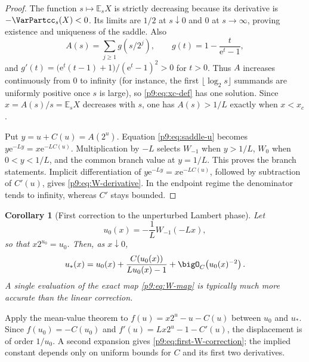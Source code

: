 \documentclass[11pt]{article}
\numberwithin{equation}{section}
\newtheorem{corollary}[theorem]{Corollary}
\theoremstyle{definition}
\theoremstyle{remark}
\newcommand{\E}{\mathbb E}
\newcommand{\e}{\mathrm e}
\begin{document}
\begin{proof}
The function $s\mapsto\E_sX$ is strictly decreasing because its derivative is
$-\VarPartcc_s(X)<0$.  Its limits are $1/2$ at $s\downarrow0$ and $0$ at $s\to\infty$, proving
existence and uniqueness of the saddle.  Also
\[
 A(s)=\sum_{j\ge1}g(s/2^j),\qquad
 g(t)=1-\frac{t}{\e^t-1},
\]
and
$g'(t)=\bigl(\e^t(t-1)+1\bigr)/(\e^t-1)^2>0$ for $t>0$.
Thus $A$ increases continuously from $0$ to infinity (for instance, the first
$\lfloor\log_2s\rfloor$ summands are uniformly positive once $s$ is large), so
\eqref{p9:eq:xc-def} has one solution.  Since $x=A(s)/s=\E_sX$ decreases with $s$, one has
$A(s)>1/L$ exactly when $x<x_c$.

Put $y=u+C(u)=A(2^u)$.  Equation \eqref{p9:eq:saddle-u} becomes
$y\e^{-Ly}=x\e^{-LC(u)}$.  Multiplication by $-L$ selects $W_{-1}$ when
$y>1/L$, $W_0$ when $0<y<1/L$, and the common branch value at $y=1/L$.  This proves the
branch statements.  Implicit differentiation of
$y\e^{-Ly}=x\e^{-LC(u)}$, followed by subtraction of $C'(u)$, gives
\eqref{p9:eq:W-derivative}.  In the endpoint regime the denominator tends to infinity,
whereas $C'$ stays bounded.
\end{proof}

\begin{corollary}[First correction to the unperturbed Lambert phase]
Let
\begin{equation}
 u_0(x)=-\frac1L W_{-1}(-Lx),                              \label{p9:eq:u0}
\end{equation}
so that $x2^{u_0}=u_0$.  Then, as $x\downarrow0$,
\begin{equation}
 u_*(x)=u_0(x)+\frac{C(u_0(x))}{Lu_0(x)-1}
 +\bigO_C\!\left(u_0(x)^{-2}\right).                       \label{p9:eq:first-W-correction}
\end{equation}
A single evaluation of the exact map \eqref{p9:eq:W-map} is typically much more accurate than
the linear correction.
\end{corollary}

\begin{proofidea}
Apply the mean-value theorem to
$f(u)=x2^u-u-C(u)$ between $u_0$ and $u_*$.  Since
$f(u_0)=-C(u_0)$ and $f'(u)=Lx2^u-1-C'(u)$, the displacement is of order $1/u_0$.
A second expansion gives \eqref{p9:eq:first-W-correction}; the implied constant depends only on uniform bounds for $C$ and its first two derivatives.
\end{proofidea}
\end{document}
